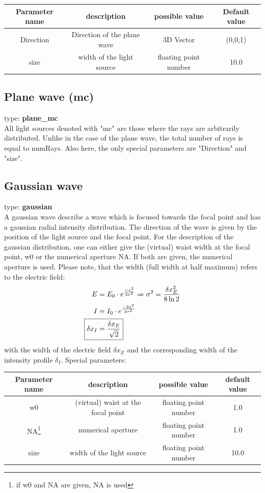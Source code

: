 \documentclass[a4paper,html,11pt,openany]{book}
\begin{document}
\vspace{1em} 
  \begin{tabular}{c|c|c|c}
 Parameter name & description  & possible value & Default value \\
 \hline
 Direction & Direction of the plane wave & 3D Vector  & (0,0,1)\\
  \hline
  size & width of the light source  & floating point number & 10.0\\
 \end{tabular}
 
 \subsection{Plane wave (mc)} 
 type: \textbf{plane\_mc} \\
 All light sources denoted with "mc" are those where the rays are arbitrarily distributed. Unlike in the case of the plane wave, the total number of rays is equal to numRays. Also here, the only special parameters are "Direction" and "size". 
 
\subsection{Gaussian wave}
 type: \textbf{gaussian} \\
A gaussian wave describe a wave which is focused  towards the focal point and has a gaussian radial intensity distribution. The direction of the wave is given by the position of the light source and the focal point. For the description of the gaussian distribution, one can either give the (virtual) waist width at the focal point, w0 or the numerical aperture NA. If both are given, the numerical aperture is used. Please note, that the width (full width at half maximum) refers to the electric field: \\ 

\begin{align}
E&=E_0 \cdot e^{\frac{-x^2}{2\sigma^2}} \Rightarrow \sigma^2=\frac{\delta x_E^2}{8\ln2} \\
I&=I_0 \cdot e^{\frac{-2x^2}{2\sigma^2}} \\
\Aboxed {\delta x_I&=\frac{\delta x_E}{\sqrt{2}}}
\end{align}
with the width of the electric field $\delta x_E$ and the corresponding width of the intensity profile $\delta_I$.
\vspace{1em}
Special parameters:

\vspace{1em}
 \begin{tabular}{c|c|c|c}
 Parameter name & description  & possible value & default value\\
 \hline
 w0 & (virtual) waist at the focal point & floating point number & 1.0 \\
 \hline
 NA\footnote{if w0 and NA are given, NA is used} & numerical aperture & floating point number & 1.0 \\ 
   \hline
  size & width of the light source  & floating point number & 10.0
 \end{tabular}
\end{document}
